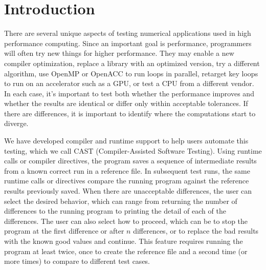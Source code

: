 \section{Introduction}

There are several unique aspects of testing numerical applications used in high performance computing.
Since an important goal is performance, programmers will often try new things for higher performance.
They may enable a new compiler optimization, replace a library with an optimized version, try a different algorithm, use OpenMP or OpenACC to run loops in parallel, retarget key loops to run on an accelerator such as a GPU, or test a CPU from a different vendor.
In each case, it's important to test both whether the performance improves and whether the results are identical or differ only within acceptable tolerances.
If there are differences, it is important to identify where the computations start to diverge.

We have developed compiler and runtime support to help users automate this testing, which we call CAST (Compiler-Assisted Software Testing).
Using runtime calls or compiler directives, the program saves a sequence of intermediate results from a known correct run in a reference file.
In subsequent test runs, the same runtime calls or directives compare the running program against the reference results previously saved.
When there are unacceptable differences, the user can select the desired behavior, which can range from returning the number of differences to the running program to printing the detail of each of the differences.
The user can also select how to proceed, which can be to stop the program at the first difference or after $n$ differences, or to replace the bad results with the known good values and continue.
This feature requires running the program at least twice, once to create the reference file and a second time (or more times) to compare to different test cases.

